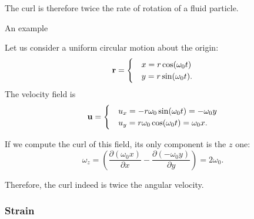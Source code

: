 The curl is therefore twice the rate of rotation of a fluid particle.


An example

Let us consider a uniform circular motion about the origin:
\[
\mathbf{r} =
\begin{cases}
&x=r \cos(\omega_0 t) \\
&y=r \sin(\omega_0 t) .
\end{cases}
\]
The velocity field is
\[
\mathbf{u} =
\begin{cases}
&u_x= -r \omega_0 \sin(\omega_0 t) = -\omega_0 y \\
&u_y=  r \omega_0 \cos(\omega_0 t) =  \omega_0 x.
\end{cases}
\]

If we compute the curl of this field, its only component is the $z$ one:
\[
\omega_z= \left(
  \frac{\partial (\omega_0  x)}{\partial x}  -
  \frac{\partial (- \omega_0 y) }{\partial y}
\right) =  2 \omega_0 . 
\]

Therefore, the curl indeed is twice the angular velocity.


\subsubsection{Strain}


